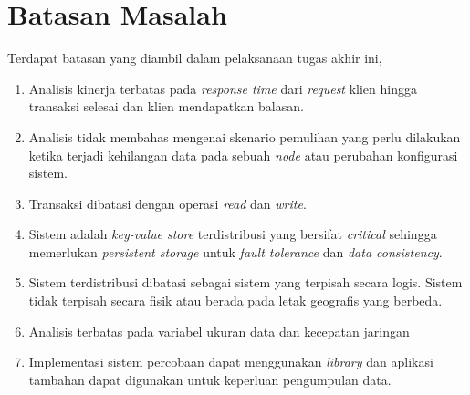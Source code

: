 \section{Batasan Masalah}
\label{sec:batasan-masalah}

Terdapat batasan yang diambil dalam pelaksanaan tugas akhir ini,

\begin{enumerate}
	\item Analisis kinerja terbatas pada \textit{response time} dari \textit{request} klien hingga transaksi selesai dan klien mendapatkan balasan.
	\item Analisis tidak membahas mengenai skenario pemulihan yang perlu dilakukan ketika terjadi kehilangan data pada sebuah \textit{node} atau perubahan konfigurasi sistem.
	\item Transaksi dibatasi dengan operasi \textit{read} dan \textit{write}.
	\item Sistem adalah \textit{key-value store} terdistribusi yang bersifat \textit{critical} sehingga memerlukan \textit{persistent storage} untuk \textit{fault tolerance} dan \textit{data consistency}.
	\item Sistem terdistribusi dibatasi sebagai sistem yang terpisah secara logis. Sistem tidak terpisah secara fisik atau berada pada letak geografis yang berbeda.
	\item Analisis terbatas pada variabel ukuran data dan kecepatan jaringan
	\item Implementasi sistem percobaan dapat menggunakan \textit{library} dan aplikasi tambahan dapat digunakan untuk keperluan pengumpulan data.
\end{enumerate}
